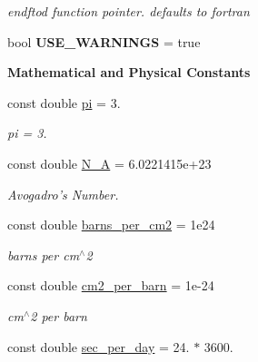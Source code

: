 \begin{DoxyCompactItemize}
\begin{DoxyCompactList}\small\item\em endftod function pointer. defaults to fortran \end{DoxyCompactList}\item 
\hypertarget{namespacepyne_aaaed56f58559ef169cab906fac4946f8}{bool {\bfseries U\-S\-E\-\_\-\-W\-A\-R\-N\-I\-N\-G\-S} = true}\label{namespacepyne_aaaed56f58559ef169cab906fac4946f8}

\end{DoxyCompactItemize}
\begin{Indent}{\bf Mathematical and Physical Constants}\par
\begin{DoxyCompactItemize}
\item 
\hypertarget{namespacepyne_a3b91aba14e56f740dc75b78b9eba037a}{const double \hyperlink{namespacepyne_a3b91aba14e56f740dc75b78b9eba037a}{pi} = 3.}\label{namespacepyne_a3b91aba14e56f740dc75b78b9eba037a}

\begin{DoxyCompactList}\small\item\em pi = 3. \end{DoxyCompactList}\item 
\hypertarget{namespacepyne_a44461c2367af5fc9b6bb0988aac2429b}{const double \hyperlink{namespacepyne_a44461c2367af5fc9b6bb0988aac2429b}{N\-\_\-\-A} = 6.\-0221415e+23}\label{namespacepyne_a44461c2367af5fc9b6bb0988aac2429b}

\begin{DoxyCompactList}\small\item\em Avogadro's Number. \end{DoxyCompactList}\item 
\hypertarget{namespacepyne_ad475cf6f124859f735f6d93ec206ec0d}{const double \hyperlink{namespacepyne_ad475cf6f124859f735f6d93ec206ec0d}{barns\-\_\-per\-\_\-cm2} = 1e24}\label{namespacepyne_ad475cf6f124859f735f6d93ec206ec0d}

\begin{DoxyCompactList}\small\item\em barns per cm$^\wedge$2 \end{DoxyCompactList}\item 
\hypertarget{namespacepyne_a0706fc6ba35f0c6f85cea550344c1815}{const double \hyperlink{namespacepyne_a0706fc6ba35f0c6f85cea550344c1815}{cm2\-\_\-per\-\_\-barn} = 1e-\/24}\label{namespacepyne_a0706fc6ba35f0c6f85cea550344c1815}

\begin{DoxyCompactList}\small\item\em cm$^\wedge$2 per barn \end{DoxyCompactList}\item 
\hypertarget{namespacepyne_a3a54f183e7323b4d62c12f309c3af081}{const double \hyperlink{namespacepyne_a3a54f183e7323b4d62c12f309c3af081}{sec\-\_\-per\-\_\-day} = 24. $\ast$ 3600.}\label{namespacepyne_a3a54f183e7323b4d62c12f309c3af081}


\end{DoxyCompactItemize}
\end{Indent}
